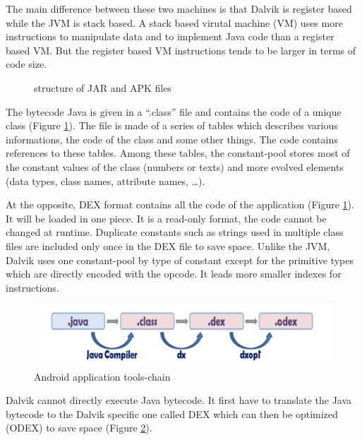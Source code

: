 \documentclass{sig-alternate}
\def \DALVIK{Dalvik\xspace}
\def \ANDROID{Android\xspace}
\def \JVM{JVM\xspace}
\def \DEX{DEX\xspace}
\begin{document}
      The main difference between these two machines is that \DALVIK is register based while the \JVM is stack based.
      A stack based virutal machine (VM) uses more instructions to manipulate data and to implement Java code than a register based VM.
      But the register based VM instructions tends to be larger in terms of code size\cite{ieee-paul-kundu-energy-perspective}.

      \begin{figure}[!h]
        \centering \resizebox{1\linewidth}{!}{}
        \caption{structure of JAR and APK files}
        \label{SJA}
      \end{figure}

      The bytecode Java is given in a ``.class'' file and contains the code of a unique class (Figure \ref{SJA}).
      The file is made of a series of tables which describes various informations, the code of the class and some other things.
      The code contains references to these tables.
      Among these tables, the constant-pool stores most of the constant values of the class (numbers or texts)
      and more evolved elements (data types, class names, attribute names, \dots).

      At the opposite, \DEX format contains all the code of the application (Figure \ref{SJA}).
      It will be loaded in one piece.
      It is a read-only format, the code cannot be changed at runtime.
      Duplicate constants such as strings used in multiple class files
      are included only once in the \DEX file to save space.
      Unlike the \JVM, \DALVIK uses one constant-pool by type of constant
      except for the primitive types which are directly encoded with the opcode.
      It leads more smaller indexes for instructions.\\

      \begin{figure}[!h]
        \centering \includegraphics[width=\columnwidth]{dex-tools-chain.png}
        \caption{\ANDROID application tools-chain}
        \label{DTC}
      \end{figure}

      \DALVIK cannot directly execute Java bytecode.
      It first have to translate the Java bytecode to the \DALVIK specific one called \DEX
      which can then be optimized (\mbox{ODEX}) to save space (Figure \ref{DTC}).
\end{document}
